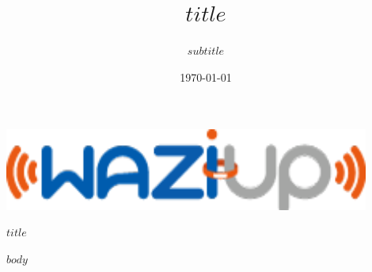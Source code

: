 \documentclass[$if(fontsize)$$fontsize$,$endif$$if(lang)$$babel-lang$,$endif$$if(papersize)$$papersize$paper,$endif$$for(classoption)$$classoption$$sep$,$endfor$]{$documentclass$}
\title{$title$}
\subtitle{$subtitle$}
\begin{document}
\begin{titlepage}
\begin{center}


\includegraphics[width=12cm]{static/images/logo-waziup.png}

\vspace{7cm}
\textsc{\Huge $title$}
 
\vspace{2cm}
\date{\today}

\end{center}
\end{titlepage}

\setcounter{tocdepth}{$toc-depth$}
\tableofcontents
\newpage

$body$
\end{document}
